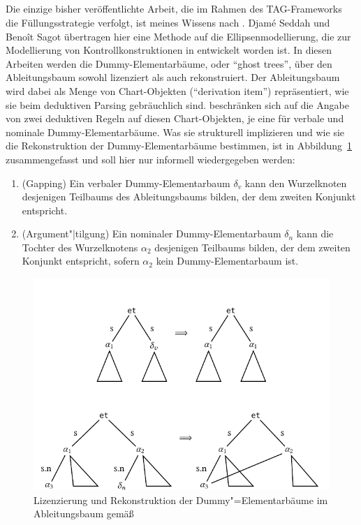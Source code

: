 \subsection{\cite{Seddah:Sagot:06}}

Die einzige bisher veröffentlichte Arbeit, die im Rahmen des TAG-Frameworks die Füllungsstrategie verfolgt, ist meines Wissens nach \cite{Seddah:Sagot:06}. Djam\'e Seddah und Beno\^{i}t Sagot übertragen hier eine Methode auf die Ellipsenmodellierung, die zur Modellierung von Kontrollkonstruktionen in \cite{Seddah:Gaiffe:05} entwickelt worden ist. In diesen Arbeiten werden die Dummy-Elementarbäume, oder "`ghost trees"', über den Ableitungsbaum sowohl lizenziert als auch rekonstruiert. Der Ableitungsbaum wird dabei als Menge von Chart-Objekten ("`derivation item"') repräsentiert, wie sie beim deduktiven Parsing \citep{Shieber:etal:95} gebräuchlich sind. \cite{Seddah:Sagot:06} beschränken sich auf die Angabe von zwei deduktiven Regeln auf diesen Chart-Objekten, je eine für verbale und nominale Dummy-Elementarbäume. Was sie strukturell implizieren und wie sie die Rekonstruktion der Dummy-Elementarbäume bestimmen, ist in Abbildung~\ref{fig-tag-fuellung-2} zusammengefasst und soll hier nur informell wiedergegeben werden:
\begin{enumerate}
  \item (Gapping) Ein verbaler Dummy-Elementarbaum $\delta_v$ kann den Wurzelknoten desjenigen Teilbaums des Ableitungsbaums bilden, der dem zweiten Konjunkt entspricht.
  \item (Argument"|tilgung) Ein nominaler Dummy-Elementarbaum $\delta_n$ kann die Tochter des Wurzelknotens $\alpha_2$ desjenigen Teilbaums bilden, der dem zweiten Konjunkt entspricht, sofern $\alpha_2$ kein Dummy-Elementarbaum ist.    
\end{enumerate}
\begin{figure}[t]
\centering
\includegraphics{graphics/abb825.pdf}
\caption{\label{fig-tag-fuellung-2}Lizenzierung und Rekonstruktion der Dummy"=Elementarbäume im Ableitungsbaum gemä\ss\ \cite{Seddah:Sagot:06}}
\end{figure} 
